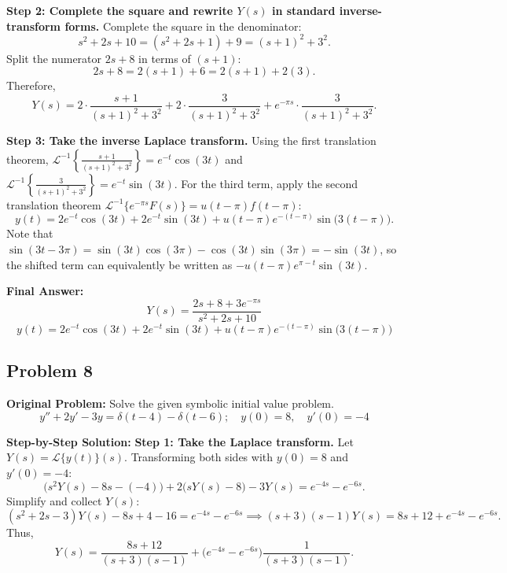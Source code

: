 \documentclass[11pt, letterpaper]{article}
\theoremstyle{definition}
\theoremstyle{remark}
\begin{document}
\textbf{Step 2: Complete the square and rewrite $Y(s)$ in standard inverse-transform forms.}
Complete the square in the denominator:
\[
    s^2 + 2s + 10 = (s^2 + 2s + 1) + 9 = (s + 1)^2 + 3^2.
\]
Split the numerator $2s + 8$ in terms of $(s + 1)$:
\[
    2s + 8 = 2(s + 1) + 6 = 2(s + 1) + 2(3).
\]
Therefore,
\[
    Y(s) = 2\cdot \frac{s + 1}{(s + 1)^2 + 3^2} + 2\cdot \frac{3}{(s + 1)^2 + 3^2} + e^{-\pi s}\cdot \frac{3}{(s + 1)^2 + 3^2}.
\]

\textbf{Step 3: Take the inverse Laplace transform.}
Using the first translation theorem, $\mathcal{L}^{-1}\left\{\frac{s+1}{(s+1)^2+3^2}\right\} = e^{-t}\cos(3t)$ and $\mathcal{L}^{-1}\left\{\frac{3}{(s+1)^2+3^2}\right\} = e^{-t}\sin(3t)$. For the third term, apply the second translation theorem $\mathcal{L}^{-1}\{e^{-\pi s}F(s)\} = u(t - \pi)f(t - \pi)$:
\[
    y(t) = 2e^{-t}\cos(3t) + 2e^{-t}\sin(3t) + u(t - \pi)e^{-(t - \pi)}\sin\bigl(3(t - \pi)\bigr).
\]
Note that $\sin(3t - 3\pi) = \sin(3t)\cos(3\pi) - \cos(3t)\sin(3\pi) = -\sin(3t)$, so the shifted term can equivalently be written as $-u(t - \pi)e^{\pi - t}\sin(3t)$.

\textbf{Final Answer:}
\[
    Y(s) = \frac{2s + 8 + 3e^{-\pi s}}{s^2 + 2s + 10}
\]
\[
    y(t) = 2e^{-t}\cos(3t) + 2e^{-t}\sin(3t) + u(t - \pi)e^{-(t - \pi)}\sin\bigl(3(t - \pi)\bigr)
\]

\subsection{Problem 8}
\textbf{Original Problem:}
Solve the given symbolic initial value problem.
\[
    y'' + 2y' - 3y = \delta(t - 4) - \delta(t - 6); \quad y(0) = 8,\quad y'(0) = -4
\]

\textbf{Step-by-Step Solution:}
\textbf{Step 1: Take the Laplace transform.}
Let $Y(s) = \mathcal{L}\{y(t)\}(s)$. Transforming both sides with $y(0) = 8$ and $y'(0) = -4$:
\[
    \bigl(s^2 Y(s) - 8s - (-4)\bigr) + 2\bigl(sY(s) - 8\bigr) - 3Y(s) = e^{-4s} - e^{-6s}.
\]
Simplify and collect $Y(s)$:
\[
    (s^2 + 2s - 3)Y(s) - 8s + 4 - 16 = e^{-4s} - e^{-6s} \implies (s + 3)(s - 1)Y(s) = 8s + 12 + e^{-4s} - e^{-6s}.
\]
Thus,
\[
    Y(s) = \frac{8s + 12}{(s + 3)(s - 1)} + \bigl(e^{-4s} - e^{-6s}\bigr)\frac{1}{(s + 3)(s - 1)}.
\]
\end{document}
